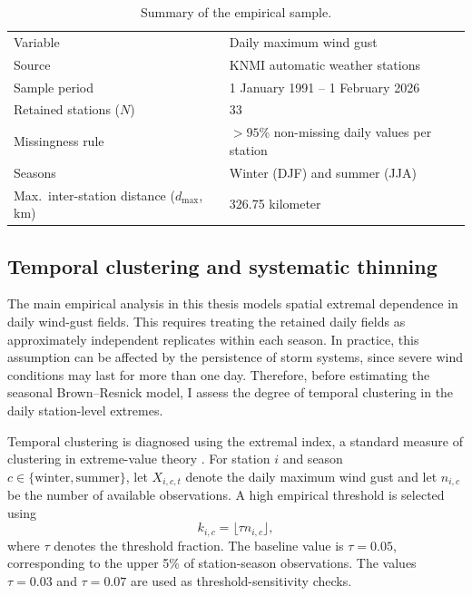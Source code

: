 \begin{table}[htbp]
    \centering
    \caption{Summary of the empirical sample.}
    \label{tab:data-summary}
    \begin{tabular}{ll}
        \hline
        Variable                                        & Daily maximum wind gust                        \\
        Source                                          & KNMI automatic weather stations                \\
        Sample period                                   & 1 January 1991 -- 1 February 2026              \\
        Retained stations (\(N\))                       & 33                                             \\
        Missingness rule                                & \(>95\%\) non-missing daily values per station \\
        Seasons                                         & Winter (DJF) and summer (JJA)                  \\
        Max.\ inter-station distance (\(d_{\max}\), km) & 326.75 kilometer                               \\
        \hline
    \end{tabular}
\end{table}


\subsection{Temporal clustering and systematic thinning}
\label{sec:data-temporal-clustering}

The main empirical analysis in this thesis models spatial extremal dependence in daily wind-gust fields. This requires treating the retained daily fields as approximately independent replicates within each season. In practice, this assumption can be affected by the persistence of storm systems, since severe wind conditions may last for more than one day. Therefore, before estimating the seasonal Brown--Resnick model, I assess the degree of temporal clustering in the daily station-level extremes.

Temporal clustering is diagnosed using the extremal index, a standard measure of clustering in extreme-value theory \citep{Leadbetter1983,SmithWeissman1994}. For station \(i\) and season \(c \in \{\mathrm{winter},\mathrm{summer}\}\), let \(X_{i,c,t}\) denote the daily maximum wind gust and let \(n_{i,c}\) be the number of available observations. A high empirical threshold is selected using
\[
    k_{i,c} = \lfloor \tau n_{i,c} \rfloor,
\]
where \(\tau\) denotes the threshold fraction. The baseline value is \(\tau = 0.05\), corresponding to the upper 5\% of station-season observations. The values \(\tau = 0.03\) and \(\tau = 0.07\) are used as threshold-sensitivity checks.

